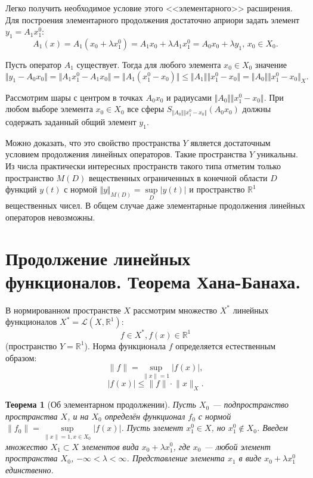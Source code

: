 \documentclass[12pt,a4paper,titlepage,oneside]{book}
\theoremstyle{definition}
\theoremstyle{plain}
\theoremstyle{break}
\newtheorem*{theorem-break}{Теорема}
\theoremstyle{remark}
\theoremstyle{remark}
\theoremstyle{remark}
\theoremstyle{remark}
\theoremstyle{plain}
\theoremstyle{plain}
\begin{document}
Легко получить необходимое условие этого <<элементарного>> расширения. Для построения элементарного продолжения достаточно априори задать элемент $y_1 = A_1 x_1^0$:
$$A_1(x) = A_1(x_0+\lambda x_1^0) = A_1x_0+\lambda A_1x_1^0 = A_0 x_0 + \lambda y_1 \mbox{, } x_0 \in X_0.$$

Пусть оператор $A_1$ существует. Тогда для любого элемента $x_0 \in X_0$ значение
$$\Vert y_1 -A_0x_0 \Vert = \Vert A_1x_1^0 - A_1x_0 \Vert = \Vert A_1(x_1^0 - x_0) \Vert \leqslant \Vert A_1 \Vert \Vert x_1^0 - x_0 \Vert = \Vert A_0 \Vert \Vert x_1^0 - x_0 \Vert_X.$$

Рассмотрим шары с центром в точках $A_0x_0$ и радиусами $\Vert A_0 \Vert \Vert x_1^0 - x_0 \Vert$. При любом выборе элемента $x_0 \in X_0$ все сферы $S_{\Vert A_0 \Vert \Vert x_1^0 - x_0 \Vert}(A_0x_0)$ должны содержать заданный общий элемент $y_1$.

Можно доказать, что это свойство пространства $Y$ является достаточным условием продолжения линейных операторов. Такие пространства $Y$ уникальны. Из числа практически интересных пространств такого типа отметим только пространство $M(\mathit{D})$ вещественных ограниченных в конечной области $D$ функций $y(t)$ с нормой $\Vert y\Vert_{M(D)} = \sup \limits_D\lvert y(t) \rvert$ и пространство $\mathbb{R}^1$ вещественных чисел.
В общем случае даже элементарные продолжения линейных операторов невозможны.

\section{Продолжение линейных функционалов. Теорема Хана-Банаха.}
В нормированном пространстве $X$ рассмотрим множество $X^*$ линейных функционалов $X^*=\mathcal{L}(X, \mathbb{R}^1)$:
$$f\in X^*, f(x)\in \mathbb{R}^1$$ (пространство $Y=\mathbb{R}^1$).
Норма функционала $f$ определяется естественным образом:
$$\lVert f \rVert = \underset{\lVert x \rVert=1}{\sup} \lvert f(x) \rvert,$$
$$\lvert f(x) \rvert \leqslant \lVert f \rVert \cdot \lVert x \rVert_X.$$

\begin{theorem-break}[Об элементарном продолжении]
Пусть $X_0$ --- подпространство пространства $X$, и на $X_0$ определён функционал $f_0$ с нормой $\lVert f_0 \rVert = \sup \limits_{\lVert x \rVert=1, x \in X_0} \lvert f(x) \rvert$. Пусть элемент $x_1^0 \in X$, но $x_1^0 \notin X_0$.
Введем множество $X_1 \subset X$ элементов вида $x_0+\lambda x_1^0$, где $x_0$ --- любой элемент пространства $X_0$, $-\infty < \lambda < \infty$. Представление элемента $x_1$ в виде $x_0+\lambda x_1^0$ единственно.
\end{theorem-break}
\end{document}
